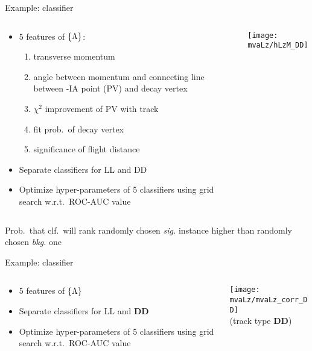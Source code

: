 \begin{frame}{Example: \Lz classifier}
    \begin{columns}
        \begin{column}{.55\textwidth}
            \begin{itemize}
                \item 5 features of $\{ {\Lambda} \}$: 
                \begin{enumerate}
                    \item transverse momentum
                    \item angle between momentum and connecting line between \proton\proton-IA point (PV) and \Lz decay vertex
                    \item $\chi^2$ improvement of PV with \Lz track
                    \item fit prob.\ of decay vertex
                    \item significance of flight distance
                \end{enumerate}
                \item Separate classifiers for LL and DD
                \item Optimize hyper-parameters of 5 classifiers using grid search w.r.t.\ ROC-AUC\ftnt{} value
            \end{itemize}
        \end{column}
        \begin{column}{.45\textwidth}
            \centering
            \texttt{[image: mvaLz/hLzM\_DD]}
        \end{column}
    \end{columns}

    \vspace{5mm}
    \footnotesize \ftnt{} Prob.\ that clf.\ will rank randomly chosen \textit{sig.} instance higher than randomly chosen \textit{bkg.} one
\end{frame}

\begin{frame}{Example: \Lz classifier}
    \begin{columns}
        \begin{column}{.45\textwidth}
            \scalebox{1.2}{\Lz classifier}
            \begin{itemize}
                \item \textcolor{vertexDarkRed}{5 features of $\{ {\Lambda} \}$}
                \item Separate classifiers for LL and \textbf{DD}
                \item Optimize hyper-parameters of 5 classifiers using grid search w.r.t.\ ROC-AUC\ftnt{} value
            \end{itemize}
        \end{column}
        \begin{column}{.5\textwidth}
            \centering
            \texttt{[image: mvaLz/mvaLz\_corr\_DD]}\\
            (track type \textbf{DD})
        \end{column}
    \end{columns}
\end{frame}

